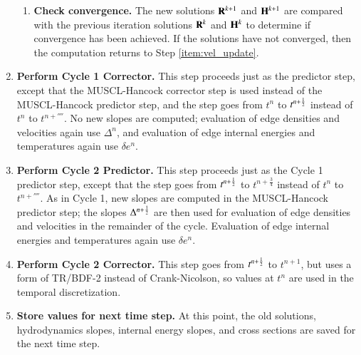 \begin{enumerate}
\begin{enumerate}
\item \textbf{Check convergence.} The new solutions $\mathbf{R}^{k+1}$ and
$\mathbf{H}^{k+1}$ are compared with the previous iteration solutions
$\mathbf{R}^k$ and $\mathbf{H}^k$ to determine if convergence has been achieved.
If the solutions have not converged, then the computation
returns to Step \ref{item:vel_update}.
\end{enumerate}


\item \textbf{Perform Cycle 1 Corrector.} This step proceeds
just as the predictor step, except that the MUSCL-Hancock
corrector step is used instead of the MUSCL-Hancock predictor
step, and the step goes from $t^n$ to $t^{n+\frac{1}{2}}$ instead
of $t^n$ to $t^{n+\fourth}$. No new slopes are computed;
evaluation of edge densities and velocities again use
$\Delta^n$, and evaluation of edge internal energies
and temperatures again use $\delta e^n$.


\item \textbf{Perform Cycle 2 Predictor.} This step proceeds
just as the Cycle 1 predictor step, except that the
step goes from $t^{n+\frac{1}{2}}$ to $t^{n+\frac{3}{4}}$ instead
of $t^n$ to $t^{n+\fourth}$. As in Cycle 1, new slopes
are computed in the MUSCL-Hancock predictor step;
the slopes $\Delta^{n+\frac{1}{2}}$ are then used for
evaluation of edge densities and velocities in the remainder
of the cycle. Evaluation of edge internal energies
and temperatures again use $\delta e^n$.


\item \textbf{Perform Cycle 2 Corrector.} This step goes
from $t^{n+\frac{1}{2}}$ to $t^{n+1}$, but uses a form of
TR/BDF-2 instead of Crank-Nicolson, so values at $t^n$
are used in the temporal discretization.


\item \textbf{Store values for next time step.}
At this point, the old solutions, hydrodynamics slopes,
internal energy slopes, and cross sections
are saved for the next time step.

\end{enumerate}
